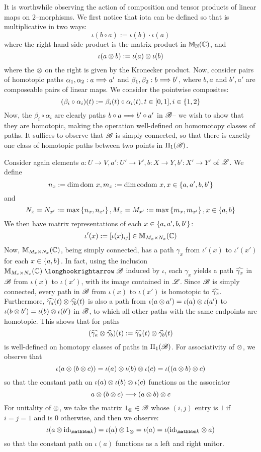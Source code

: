 \documentclass[./Thick_TQFTs_and_Quantum_Information.tex]{subfiles}
\begin{document}
It is worthwhile observing the action of composition and tensor products of
linear maps on $2$--morphisms. We first notice that iota can be defined so that
is multiplicative in two ways:
\[
  \iota(b \circ a) := \iota(b) \cdot \iota(a)
\]
where the right-hand-side product is the matrix product in $\mathbb{M}_{\mathbb{N}}(\mathbb{C})$, and
\[
  \iota(a \otimes b) := \iota(a) \otimes \iota(b)
\]
where the $\otimes$ on the right is given by the Kronecker product. Now,
consider pairs of homotopic paths
$\alpha_1, \alpha_2 : a \stackrel{}{\Longrightarrow} a'$ and
$\beta_1, \beta_2 : b \stackrel{}{\Longrightarrow} b'$, where $b, a$ and $b', a'$ are
composeable pairs of linear maps. We consider the pointwise composites:
\begin{equation}\label{eqn:pointwise_comp}
  (\beta_i \circ \alpha_i)(t) := \beta_i(t) \circ \alpha_i(t), t \in [0, 1],
    i \in \set{1, 2}
\end{equation}
Now, the $\beta_i \circ \alpha_i$ are clearly paths
$b \circ a \stackrel{}{\Longrightarrow} b' \circ a'$ in $\mathscr{B}$-- we wish to show that
they are homotopic, making the operation well-defined on homomotopy classes of
paths. It suffices to observe that $\mathscr{B}$ is simply connected, so that there is
exactly one class of homotopic paths between two points in $\Pi_1(\mathscr{B})$.

Consider again elements
$a : U \to V, a' : U' \to V', b : X \to Y, b' : X' \to Y'$ of $\mathscr{L}$. We define
\[
  n_x := \dim \dom x, m_x := \dim \codom x, x \in \set{a, a', b, b'}
\]
and
\[
  N_{x} = N_{x'} := \max\set{n_x, n_{x'}},
  M_{x} = M_{x'} := \max\set{m_x, m_{x'}}, x \in \set{a, b}
\]
We then have matrix representations of each $x \in \set{a, a', b, b'}$:
\[
  \iota'(x) := [\iota(x)_{ij}] \in \mathbb{M}_{M_x \times N_x}(\mathbb{C})
\]
Now, $\mathbb{M}_{M_x \times N_x}(\mathbb{C})$, being simply connected, has a path
$\gamma_x$ from $\iota'(x)$ to $\iota'(x')$ for each $x \in \set{a, b}$. In
fact, using the inclusion $\M_{M_x \times N_x}(\C) \hto \s{B}$ induced by
$\iota$, each $\gamma_x$ yields a path $\widehat{\gamma_x}$ in $\mathscr{B}$ from
$\iota(x)$ to $\iota(x')$, with its image contained in $\mathscr{L}$. Since $\mathscr{B}$ is
simply connected, every path in $\mathscr{B}$ from $\iota(x)$ to $\iota(x')$ is
homotopic to $\widehat{\gamma_x}$. Furthermore,
$\widehat{\gamma_a}(t) \otimes \widehat{\gamma_b}(t)$ is also a path from
$\iota(a \otimes a') = \iota(a) \otimes \iota(a')$ to
$\iota(b \otimes b') = \iota(b) \otimes \iota(b')$ in $\mathscr{B}$, to which all
other paths with the same endpoints are homotopic. This shows that for paths
\[
  (\widehat{\gamma_a} \otimes \widehat{\gamma_b})(t) :=
    \widehat{\gamma_a}(t) \otimes \widehat{\gamma_b}(t)
\]
is well-defined on homotopy classes of paths in $\Pi_1(\mathscr{B})$. For
associativity of $\otimes$, we observe that
\[
  \iota(a \otimes (b \otimes c))
    = \iota(a) \otimes \iota(b) \otimes \iota(c)
    = \iota((a \otimes b) \otimes c)
\]
so that the constant path on $\iota(a) \otimes \iota(b) \otimes \iota(c)$
functions as the associator
\[
  a \otimes (b \otimes c) \stackrel{}{\longrightarrow} (a \otimes b) \otimes c
\]
For unitality of $\otimes$, we take the matrix $1_{\otimes} \in \mathscr{B}$ whose
$(i, j)$ entry is $1$ if $i = j = 1$ and is $0$ otherwise, and then we observe:
\[
  \iota(a \tensor \id_{\K}) = \iota(a) \tensor 1_{\tensor} = \iota(a)
    = \iota(\id_{\K} \tensor a)
\]
so that the constant path on $\iota(a)$ functions as a left and right unitor.
\end{document}
